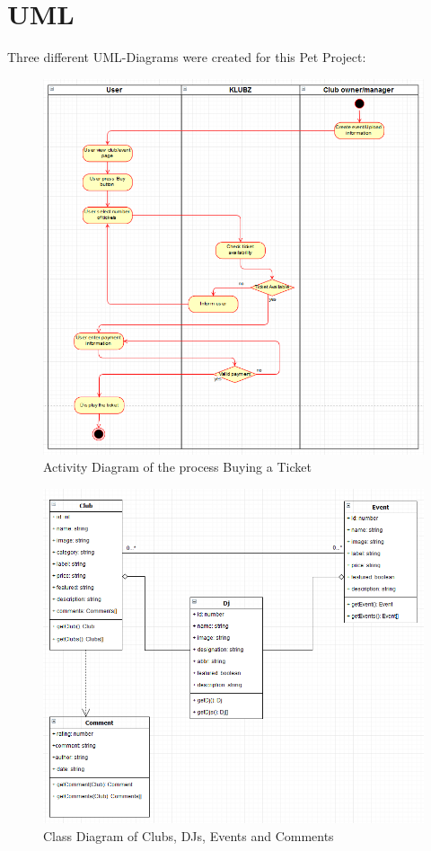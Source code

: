 \documentclass[12pt]{article}
\begin{document}
\newpage
\section{UML}

Three different UML-Diagrams were created for this Pet Project:

\begin{figure}[H]
  \centering
    \includegraphics[width=1\textwidth]{figures/ActivityDiagram.png}
    \caption{Activity Diagram of the process Buying a Ticket}
\end{figure}

\begin{figure}[H]
  \centering
    \includegraphics[width=1\textwidth]{figures/ClassDiagram.png}
    \caption{Class Diagram of Clubs, DJs, Events and Comments}
\end{figure}
\end{document}
